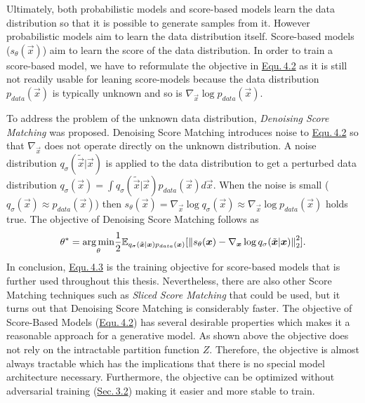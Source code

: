 Ultimately, both probabilistic models and score-based models learn the data distribution so that it is possible to generate samples from it. However probabilistic models aim to learn the data distribution itself. Score-based models ($s_\theta(\vec{x})$) aim to learn the score of the data distribution. In order to train a score-based model, we have to reformulate the objective in \hyperref[equ:4.2]{Equ.\,4.2} as it is still not readily usable for leaning score-models because the data distribution $p_{data}(\vec{x})$ is typically unknown and so is $\nabla_{\vec{x}}\log p_{data}(\vec{x})$. 

To address the problem of the unknown data distribution, \textit{Denoising Score Matching} \cite{denoise_score} was proposed. Denoising Score Matching introduces noise to \hyperref[equ:4.2]{Equ.\,4.2} so that $\nabla_{\vec{x}}$ does not operate directly on the unknown distribution. A noise distribution $q_\sigma(\tilde{\vec{x}}|\vec{x})$ is applied to the data distribution to get a perturbed data distribution $q_\sigma(\vec{x})=\int q_\sigma(\tilde{\vec{x}}|\vec{x})p_{data}(\vec{x})d\vec{x}$. When the noise is small ($q_\sigma(\vec{x})\approx p_{data}(\vec{x})$) then $s_\theta(\vec{x})=\nabla_{\vec{x}}\log q_\sigma(\vec{x})\approx\nabla_{\vec{x}}\log p_{data}(\vec{x})$ holds true. The objective of Denoising Score Matching follows as
%
\begin{equation} \label{equ:4.3}
    \theta^*=\underset{\theta}{\arg\min}\frac{1}{2}\mathbb{E}_{q_\sigma(\tilde{\boldsymbol{x}}|\boldsymbol{x})p_{data}(\boldsymbol{x})}[\left\lVert s_\theta(\boldsymbol{x})-\nabla_{\boldsymbol{x}}\log q_\sigma(\tilde{\boldsymbol{x}}|\boldsymbol{x})\right\rVert^2_2].
\end{equation}
%
In conclusion, \hyperref[equ:4.3]{Equ.\,4.3} is the training objective for score-based models that is further used throughout this thesis. Nevertheless, there are also other Score Matching techniques such as \textit{Sliced Score Matching} \cite{song2019sliced} that could be used, but it turns out that Denoising Score Matching is considerably faster. The objective of Score-Based Models (\hyperref[equ:4.2]{Equ.\,4.2}) has several desirable properties which makes it a reasonable approach for a generative model. As shown above the objective does not rely on the intractable partition function $Z$. Therefore, the objective is almost always tractable which has the implications that there is no special model architecture necessary. Furthermore, the objective can be optimized without adversarial training (\hyperref[sec:gans]{Sec.\,3.2}) making it easier and more stable to train.

